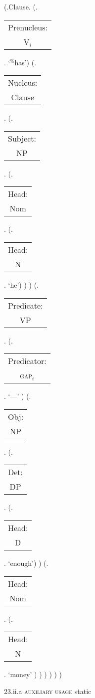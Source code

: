\documentclass[12pt,letterpaper]{article}
\begin{document}
\begin{figure}
	\begin{center}
		\begin{parsetree}
			(.Clause.
			(.\begin{tabular}{c}Prenucleus:\\V$_i$\end{tabular}. `$^\%$has')
			(.\begin{tabular}{c}Nucleus:\\Clause\end{tabular}.    
			(.\begin{tabular}{c}Subject:\\NP\end{tabular}.  
			(.\begin{tabular}{c}Head:\\Nom\end{tabular}.
			(.\begin{tabular}{c}Head:\\N\end{tabular}. `he')
			)
			)
			(.\begin{tabular}{c}Predicate:\\VP\end{tabular}.
			(.\begin{tabular}{c}Predicator:\\\textsc{gap}$_i$\end{tabular}.    `---' )
			(.\begin{tabular}{c}Obj:\\NP\end{tabular}.
			(.\begin{tabular}{c}Det:\\DP\end{tabular}.
			(.\begin{tabular}{c}Head:\\D\end{tabular}. `enough')
			)
			(.\begin{tabular}{c}Head:\\Nom\end{tabular}.
			(.\begin{tabular}{c}Head:\\N\end{tabular}. `money' )
			)
			)
			)
			)
			)
			
		\end{parsetree}
		\hfill \break \hfill \break
		23.ii.a \textsc{auxiliary usage} static
	\end{center}
\end{figure}
\end{document}

